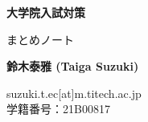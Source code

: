 \begin{titlepage}
	\thispagestyle{frontpage}
	\begin{center}
		\vspace*{6\baselineskip}
		
		{\Huge \textbf{大学院入試対策\\}}
		
		\large{まとめノート}\\
		
        \vspace*{1,5\baselineskip}

		\large{\textbf{鈴木泰雅 (Taiga Suzuki)}}\\
		
		\vspace{1,5\baselineskip}
		
		\large{suzuki.t.ec[at]m.titech.ac.jp}\\
		\large{学籍番号：21B00817}\\
		
		\vspace{1,5\baselineskip}
	\end{center}
	
	\vspace*{4\baselineskip}
	
\end{titlepage}